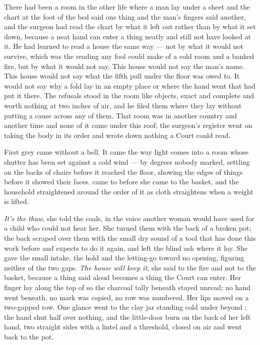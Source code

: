There had been a room in the other life where a man lay under a sheet and the chart at the foot of the bed said one thing and the man's fingers said another, and the surgeon had read the chart by what it left out rather than by what it set down, because a neat hand can enter a thing neatly and still not have looked at it. He had learned to read a house the same way --- not by what it would not survive, which was the reading any fool could make of a cold room and a banked fire, but by what it would not say. This house would not say the man's name. This house would not say what the fifth pull under the floor was owed to. It would not say why a fold lay in an empty place or where the hand went that had put it there. The refusals stood in the room like objects, exact and complete and worth nothing at two inches of air, and he filed them where they lay without putting a cause across any of them. That room was in another country and another time and none of it came under this roof; the surgeon's register went on taking the body in its order and wrote down nothing a Court could read.

\scenebreak

First grey came without a bell. It came the way light comes into a room whose shutter has been set against a cold wind --- by degrees nobody marked, settling on the backs of chairs before it reached the floor, showing the edges of things before it showed their faces.  came to  before she came to the basket, and the household straightened around the order of it as cloth straightens when a weight is lifted.

\emph{It's the thaw}, she told the coals, in the voice another woman would have used for a child who could not hear her. She turned them with the back of a broken pot; the back scraped over them with the small dry sound of a tool that has done this work before and expects to do it again, and left the blind ash where it lay. She gave the small intake, the hold and the letting-go toward no opening, figuring neither of the two gaps. \emph{The house will keep it}, she said to the fire and not to the basket, because a thing said aloud becomes a thing the Court can enter. Her finger lay along the top of  so the charcoal tally beneath stayed unread; no hand went beneath, no mark was copied, no row was numbered. Her lips moved on a two-gapped row. One glance went to the clay jar standing cold under  beyond ; the hand shut half over nothing, and the little-door burn on the back of her left hand, two straight sides with a lintel and a threshold, closed on air and went back to the pot.

